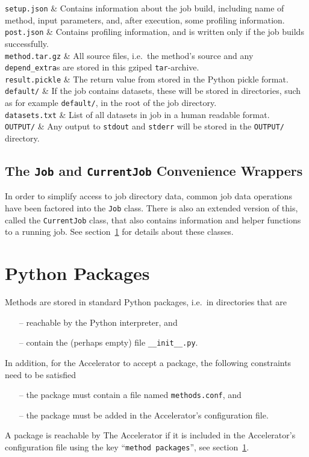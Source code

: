 \starttabletwo

\texttt{setup.json} & Contains information about the job build,
including name of method, input parameters, and, after execution, some
profiling information.\\

\texttt{post.json} & Contains profiling information, and is written
only if the job builds successfully.\\

\texttt{method.tar.gz} & All source files, i.e.\ the method's source
and any \texttt{depend\_extra}s are stored in this gziped
\texttt{tar}-archive.\\

\texttt{result.pickle} & The return value from \synthesis stored in the
Python pickle format.\\

\texttt{default/} & If the job contains datasets, these will be stored
in directories, such as for example \texttt{default/}, in the root of
the job directory.\\

\texttt{datasets.txt} & List of all datasets in job in a human
readable format.\\

\texttt{OUTPUT/} & Any output to \texttt{stdout} and \texttt{stderr} will be
stored in the \texttt{OUTPUT/} directory.\\
\stoptabletwo


\subsection{The \texttt{Job} and \texttt{CurrentJob} Convenience Wrappers}
In order to simplify access to job directory data, common job data
operations have been factored into the \texttt{Job} class.  There is
also an extended version of this, called the \texttt{CurrentJob}
class, that also contains information and helper functions to a
running job.  See section~\ref{} for details about these classes.



\section{Python Packages}
Methods are stored in standard Python packages, i.e.\ in directories
that are
\begin{itemize}
\item[--] reachable by the Python interpreter, and
\item[--] contain the (perhaps empty) file \texttt{\_\_init\_\_.py}.
\end{itemize}
In addition, for the Accelerator to accept a package, the following
constraints need to be satisfied
\begin{itemize}
\item[--] the package must contain a file named \texttt{methods.conf}, and
\item[--] the package must be added in the Accelerator's configuration file.
\end{itemize}
A package is reachable by The Accelerator if it is included in the
Accelerator's configuration file using the key
``\texttt{method packages}'', see section~\ref{}.


